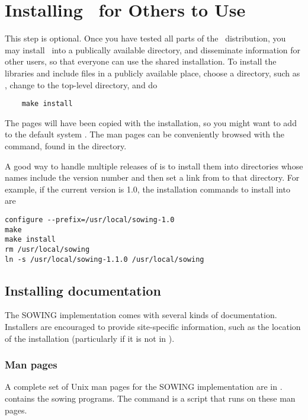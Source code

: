 {\section{Installing \sowing\ for Others to Use}
\label{sec:installing}
This step is optional.  
Once you have tested all parts of the \Sowing\ distribution, you may install
\sowing\ into 
a publically available directory, and disseminate information for other users,
so that everyone can use the shared installation.
To install the libraries and include files in a
publicly available place, choose a directory, such as ,
change to the top-level  directory, and do
\begin{verbatim}
    make install
\end{verbatim}
The  pages will have been copied with the installation, so you might
want to add  to the default system .
The man pages can be conveniently browsed with the  command,
found in the  directory.

A good way to handle multiple releases of  is to install
them into directories whose names include the version number and then
set a link from  to that directory.  For example, if the
current version is 1.0, the installation commands to install into
 are 
\begin{verbatim}
configure --prefix=/usr/local/sowing-1.0
make
make install 
rm /usr/local/sowing
ln -s /usr/local/sowing-1.1.0 /usr/local/sowing
\end{verbatim}


\subsection{Installing documentation}
The SOWING implementation comes with several kinds of documentation.
Installers are encouraged to provide site-specific information, such
as the location of the installation (particularly if it is not in
).

\subsubsection{Man pages}
A complete set of Unix man pages for the SOWING implementation are in
.   contains the sowing programs.
The command  is a script that runs 
on these man pages.

}
